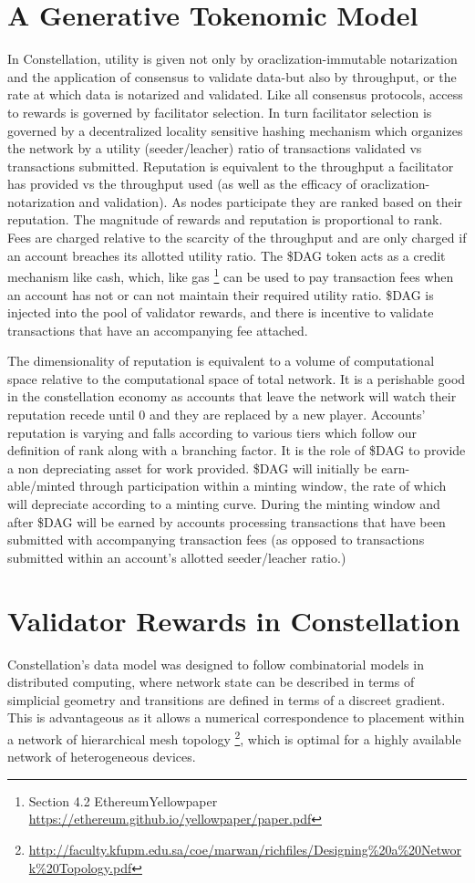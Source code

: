 \documentclass{article}
\begin{document}
\section{A Generative Tokenomic Model}
In Constellation, utility is given not only by oraclization-immutable notarization and the application of consensus to validate data-but also by throughput, or the rate at which data is notarized and validated. Like all consensus protocols, access to rewards is governed by facilitator selection. In turn facilitator selection is governed by a decentralized locality sensitive hashing mechanism which organizes the network by a utility (seeder/leacher) ratio of transactions validated vs transactions submitted. Reputation is equivalent to the throughput a facilitator has provided vs the throughput used (as well as the efficacy of oraclization-notarization and validation). As nodes participate they are ranked based on their reputation. The magnitude of rewards and reputation is proportional to rank. Fees are charged relative to the scarcity of the throughput and are only charged if an account breaches its allotted utility ratio. The \$DAG token acts as a credit mechanism like cash, which, like gas
\footnote{Section 4.2 EthereumYellowpaper\\ \url{https://ethereum.github.io/yellowpaper/paper.pdf}} 
can be used to pay transaction fees when an account has not or can not maintain their required utility ratio. \$DAG is injected into the pool of validator rewards, and there is incentive to validate transactions that have an accompanying fee attached. 

The dimensionality of reputation is equivalent to a volume of computational space relative to the computational space of total network. It is a perishable good in the constellation economy as accounts that leave the network will watch their reputation recede until 0 and they are replaced by a new player. Accounts' reputation is varying and falls according to various tiers which follow our definition of rank along with a branching factor. It is the role of \$DAG to provide a non depreciating asset for work provided. \$DAG will initially be earn-able/minted through participation within a minting window, the rate of which will depreciate according to a minting curve. During the minting window and after  \$DAG will be earned by accounts processing transactions that have been submitted with accompanying transaction fees (as opposed to transactions submitted within an account's allotted seeder/leacher ratio.)

\section{Validator Rewards in Constellation}
Constellation's data model was designed to follow combinatorial models in distributed computing, where network state can be described in terms of simplicial geometry and transitions are defined in terms of a discreet gradient. This is advantageous as it allows a numerical correspondence to placement within a network of hierarchical mesh topology
\footnote{\url{http://faculty.kfupm.edu.sa/coe/marwan/richfiles/Designing\%20a\%20Network\%20Topology.pdf}}, 
which is optimal for a highly available network of heterogeneous devices.
\end{document}
